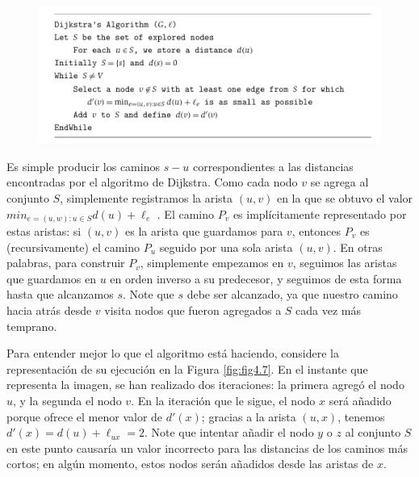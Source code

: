 \documentclass[a4paper, 12pt]{book}
\theoremstyle{dotless}
\begin{document}
\begin{figure}[h]
    \centering
    \includegraphics[width=\textwidth]{Imagenes-Seccion4/algoritmodijkstra.png}
\end{figure}


Es simple producir los caminos $s-u$ correspondientes a las distancias encontradas por el algoritmo de Dijkstra. 
Como cada nodo $v$ se agrega al conjunto $S$, simplemente registramos la arista $(u, v)$ en la que se obtuvo el valor $min_{e=(u,w):u \in S} d (u) + \ell_e$ . El camino $P_v$ es implícitamente representado por estas aristas: si $(u,v)$ es la arista que guardamos para $v$, entonces $P_v$ es (recursivamente) el camino $P_u$ seguido por una sola arista $(u,v)$. En otras palabras, para construir $P_v$, simplemente empezamos en $v$, seguimos las aristas que guardamos en $u$ en orden inverso a su predecesor, y seguimos de esta forma hasta que alcanzamos $s$. Note que $s$ debe ser alcanzado, ya que nuestro camino hacia atrás desde $v$ visita nodos que fueron agregados a $S$ cada vez más temprano.

Para entender mejor lo que el algoritmo está haciendo, considere la representación de su ejecución en la Figura \ref{fig:fig4.7}. En el instante que representa la imagen, se han realizado dos iteraciones: la primera agregó el nodo $u$, y la segunda el nodo $v$. En la iteración que le sigue, el nodo $x$ será añadido porque ofrece el menor valor de $d'(x)$; gracias a la arista $(u,x)$, tenemos $d'(x) = d(u) + \ell_{ux} = 2$. Note que intentar añadir el nodo $y$ o $z$ al conjunto $S$ en este punto causaría un valor incorrecto para las distancias de los caminos más cortos; en algún momento, estos nodos serán añadidos desde las aristas de $x$.
\end{document}
